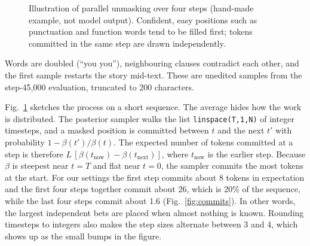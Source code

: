 \documentclass[conference]{IEEEtran}
\def\mmark{M}
\begin{document}
\begin{figure}[t]
\centering
{}
\caption{Illustration of parallel unmasking over four steps (hand-made example,
not model output). Confident, easy positions such as punctuation and function
words tend to be filled first; tokens committed in the same step are drawn
independently.}
\label{fig:reveal}
\end{figure}

Words are doubled (``you you''), neighbouring clauses contradict each other,
and the first sample restarts the story mid-text. These are unedited samples
from the step-45,000 evaluation, truncated to 200 characters.

Fig.~\ref{fig:reveal} sketches the process on a short sequence. The average
hides how the work is distributed. The posterior sampler walks the
list \texttt{linspace(T,1,N)} of integer timesteps, and a masked position is
committed between $t$ and the next $t'$ with probability
$1-\beta(t')/\beta(t)$. The expected number of tokens committed at a step is
therefore $L\,[\beta(t_{\text{now}})-\beta(t_{\text{next}})]$, where
$t_{\text{now}}$ is the earlier step. Because $\beta$ is steepest near $t{=}T$
and flat near $t{=}0$, the sampler commits the most tokens at the start. For
our settings the first step commits about 8 tokens in expectation and the
first four steps together commit about 26, which is 20\% of the sequence,
while the last four steps commit about 1.6 (Fig.~\ref{fig:commits}). In other
words, the largest independent bets are placed when almost nothing is known.
Rounding timesteps to integers also makes the step sizes alternate between 3
and 4, which shows up as the small bumps in the figure.
\end{document}
